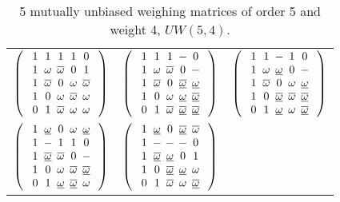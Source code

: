\begin{table}[H]\centering\caption{5 mutually unbiased weighing matrices of order 5 and weight 4, $UW(5,4)$.}
\begin{tabular}{@{}ccc@{}}\toprule\label{table:UW5_4}
$
\left(\begin{array}{c}
\Zp\Zp\Zp\Zp\Zz\\
\Zp\Za\ZA\Zz\Zp\\
\Zp\ZA\Zz\Za\ZA\\
\Zp\Zz\Za\ZA\Za\\
\Zz\Zp\ZA\Za\Za\\
\end{array}\right)$ & $
\left(\begin{array}{c}
\Zp\Zp\Zp\Zm\Zz\\
\Zp\Za\ZA\Zz\Zm\\
\Zp\ZA\Zz\Zb\ZB\\
\Zp\Zz\Za\ZB\Zb\\
\Zz\Zp\ZA\Zb\Zb\\
\end{array}\right)$ & $
\left(\begin{array}{c}
\Zp\Zp\Zm\Zp\Zz\\
\Zp\Za\ZB\Zz\Zm\\
\Zp\ZA\Zz\Za\ZB\\
\Zp\Zz\Zb\ZA\Zb\\
\Zz\Zp\ZB\Za\Zb\\
\end{array}\right)$ \\[1.25cm] $
\left(\begin{array}{c}
\Zp\ZB\Zz\Za\ZB\\
\Zp\Zm\Zp\Zp\Zz\\
\Zp\Zb\ZA\Zz\Zm\\
\Zp\Zz\Za\ZA\Zb\\
\Zz\Zp\ZB\Zb\Za\\
\end{array}\right)$ & $
\left(\begin{array}{c}
\Zp\ZB\Zz\Zb\ZA\\
\Zp\Zm\Zm\Zm\Zz\\
\Zp\Zb\ZB\Zz\Zp\\
\Zp\Zz\Zb\ZB\Za\\
\Zz\Zp\ZA\Za\Zb\\
\end{array}\right)
$\\
\bottomrule
\end{tabular}
\end{table}


